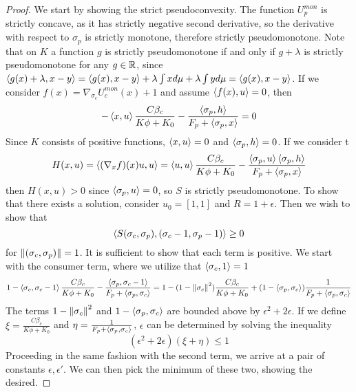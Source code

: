 \begin{proof}
  We start by showing the strict pseudoconvexity. The function $U_p^{mon}$ is strictly concave, as it has strictly negative second derivative, so the derivative with respect to $\sigma_p$ is strictly monotone, therefore strictly pseudomonotone. Note that on $K$ a function $g$ is strictly pseudomonotone if and only if $g+\lambda$ is strictly pseudomonotone for any $g\in \mathbb{R}$, since $\left \langle g(x)+\lambda,x-y \right \rangle=\left \langle g(x),x-y \right \rangle+\lambda \int x d\mu + \lambda \int y d\mu=\left \langle g(x),x-y \right \rangle$. If we consider $f(x)=\nabla_{\sigma_c} U_c^{mon}(x)+1$ and assume $\left \langle f(x),u \right \rangle = 0$, then
  \begin{equation}
    -\ip{x}{u}\frac{ C \beta_c }{K\phi + K_0} - \frac{\ip{\sigma_p}{h}}{F_p + \ip{\sigma_p}{x}} = 0
  \end{equation}
  Since $K$ consists of positive functions, $\left \langle x,u \right \rangle = 0$ and $\left \langle \sigma_p,h \right \rangle = 0$. If we consider t
  \begin{equation}
    H(x,u)=\ip{(\nabla_x f)(x)u}{u} = \ip{u}{u}\frac{ C \beta_c }{K\phi + K_0} - \frac{\ip{\sigma_p}{u}\ip{\sigma_p}{h}}{F_p + \ip{\sigma_p}{x}}
  \end{equation}
  then $H(x,u)>0$ since $\left \langle \sigma_p,u \right \rangle=0$, so $S$ is strictly pseudomonotone. To show that there exists a solution, consider $u_0 = [1,1]$ and $R=1+\epsilon$. Then we wish to show that
  \begin{equation}
    \left \langle S(\sigma_c,\sigma_p),(\sigma_c-1, \sigma_p-1) \right \rangle \geq 0
  \end{equation}
  for $\left \Vert (\sigma_c,\sigma_p) \right \Vert = 1$. It is sufficient to show that each term is positive. We start with the consumer term, where we utilize that $\left \langle \sigma_c,1 \right \rangle=1$
  \begin{equation}
    1-\ip{\sigma_c}{\sigma_c-1}\frac{ C \beta_c }{K\phi + K_0} - \frac{\ip{\sigma_p}{\sigma_c-1}}{F_p + \ip{\sigma_p}{\sigma_c}} =
    1-(1-\norm{\sigma_c}^2)\frac{ C \beta_c }{K\phi + K_0}+(1-\ip{\sigma_p}{\sigma_c})\frac{1}{F_p + \ip{\sigma_p}{\sigma_c}}
  \end{equation}
  The terms $1-\left \Vert \sigma_c \right \Vert^2$ and $1-\left \langle \sigma_p,\sigma_c \right \rangle$ are bounded above by $\epsilon^2+2\epsilon$. If we define $\xi = \frac{C \beta_c }{K\phi + K_0}$ and $\eta = \frac{1}{F_p + \left \langle \sigma_p,\sigma_c \right \rangle}$, $\epsilon$ can be determined by solving the inequality
  \begin{equation}
    (\epsilon^2+2\epsilon)(\xi+\eta) \leq 1
  \end{equation}
  Proceeding in the same fashion with the second term, we arrive at a pair of constants $\epsilon,\epsilon'$. We can then pick the minimum of these two, showing the desired.
\end{proof}
